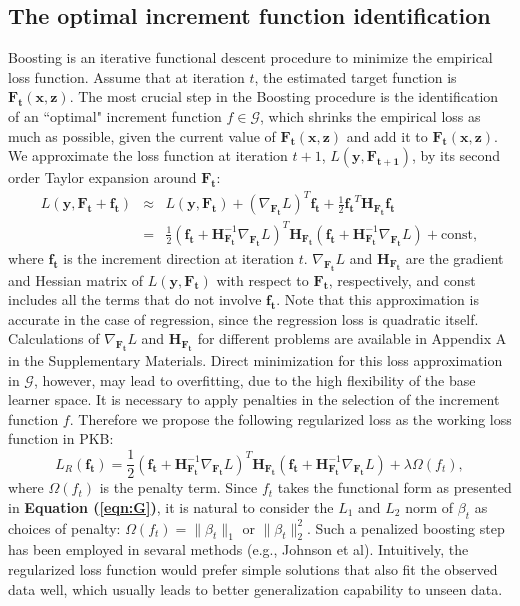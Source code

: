 \documentclass[a4paper,12pt]{article}
\newcommand{\bd}[1]{\mathbf{#1}}
\newcommand{\grad}[2]{\nabla_{\bd{#2}} #1}
\newcommand{\hess}[1]{\bd{H}_{\bd{#1}}}
\begin{document}
	\subsection{The optimal increment function identification} \label{sec:identify}
	Boosting is an iterative functional descent procedure to minimize the empirical loss function. Assume that at iteration $t$, the estimated target function is $\bd{F_t}(\bd{x}, \bd{z})$. The most crucial step in the Boosting procedure is the identification of an ``optimal" increment function $f \in \mathcal{G}$, which shrinks the empirical loss as much as possible, given the current value of $\bd{F_t}(\bd{x}, \bd{z})$ and add it to $\bd{F_t}(\bd{x}, \bd{z})$. We approximate the loss function at iteration $t+1$, $L(\bd{y},\bd{F_{t+1}})$, by its second order Taylor expansion around $\bd{F_t}$:
	\begin{eqnarray*}
		L(\bd{y}, \bd{F_t} + \bd{f_t}) &\approx& L(\bd{y}, \bd{F_t}) +  (\grad{L}{F_t})^T \bd{f_t} + \frac{1}{2}\bd{f_t}^T \hess{F_t} \bd{f_t} \\
		& = & \frac{1}{2} (\bd{f_t} + \hess{F_t}^{-1} \grad{L}{F_t})^T \hess{F_t} (\bd{f_t} + \hess{F_t}^{-1} \grad{L}{F_t}) + \mbox{const},
	\end{eqnarray*}
where $\bd{f_t}$ is the increment direction at iteration $t$. $\nabla_{\bd{F_t}} L$ and $\bd{H}_{\bd{F_t}}$ are the gradient and Hessian matrix of $L(\bd{y}, \bd{F_t})$ with respect to $\bd{F_t}$, respectively, and const includes all the terms that do not involve $\bd{f_t}$. Note that this approximation is accurate in the case of regression, since the regression loss is quadratic itself. Calculations of $\grad{L}{F_t}$ and $\hess{F_t}$ for different problems are available in Appendix A in the Supplementary Materials. Direct minimization for this loss approximation in $\mathcal{G}$, however, may lead to overfitting, due to the high flexibility of the base learner space. It is necessary to apply penalties in the selection of the increment function  $f$. Therefore we propose the following regularized loss as the working loss function in PKB:
$$L_{R}(\bd{f_t}) = \frac{1}{2} (\bd{f_t} + \hess{F_t}^{-1} \grad{L}{F_t})^T \hess{F_t} (\bd{f_t} + \hess{F_t}^{-1} \grad{L}{F_t}) + \lambda \Omega({f_t}),$$
where $\Omega({f_t})$ is the penalty term. Since ${f_t}$ takes the functional form as presented in \textbf{Equation (\ref{eqn:G})}, it is natural to consider the  $L_1$ and $L_2$ norm of $\beta_t$ as choices of penalty: $\Omega({f_t}) = \| \beta_t \|_1$ or $\| \beta_t \|_2^2$. Such a penalized boosting step has been employed in sevaral methods (e.g., Johnson et al). \cite{johnson2014learning} Intuitively, the regularized loss function would prefer simple solutions that also fit the observed data well, which usually leads to better generalization capability to unseen data.
\end{document}
